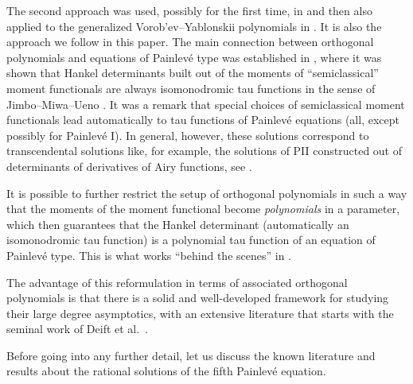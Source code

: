 \documentclass[10pt,a4paper]{amsart}
\numberwithin{equation}{section}
\theoremstyle{definition}
\begin{document}
The second approach was used, possibly for the first time, in \cite{BertolaBothner} and then also applied to the generalized Vorob'ev--Yablonskii polynomials in \cite{BalBerBo}. It is also the approach we follow in this paper.
The main connection between orthogonal polynomials and equations of Painlev\'e type was established in \cite{Bertola:Semiiso}, where it was shown that Hankel determinants built out of the moments of ``semiclassical'' moment functionals are always isomonodromic tau functions in the sense of Jimbo--Miwa--Ueno \cite{JMU1}. It was a remark \cite[Remark~5.3]{Bertola:Semiiso} that special choices of semiclassical moment functionals lead automatically to tau functions of Painlev\'e equations (all, except possibly for Painlev\'e I). In general, however, these solutions correspond to transcendental solutions like, for example, the solutions of PII constructed out of determinants of derivatives of Airy functions, see \cite{JoshiKajiwara}.

It is possible to further restrict the setup of orthogonal polynomials in such a way that the moments of the moment functional become {\it polynomials} in a parameter, which then guarantees that the Hankel determinant (automatically an isomonodromic tau function) is a polynomial tau function of an equation of Painlev\'e type. This is what works ``behind the scenes'' in \cite{BertolaBothner}.

The advantage of this reformulation in terms of associated orthogonal polynomials is that there is a solid and well-developed framework for studying their large degree asymptotics, with an extensive literature that starts with the seminal work of Deift et al.~\cite{DKMVZ}.

Before going into any further detail, let us discuss the known literature and results about the rational solutions of the fifth Painlev\'e equation.
\end{document}
